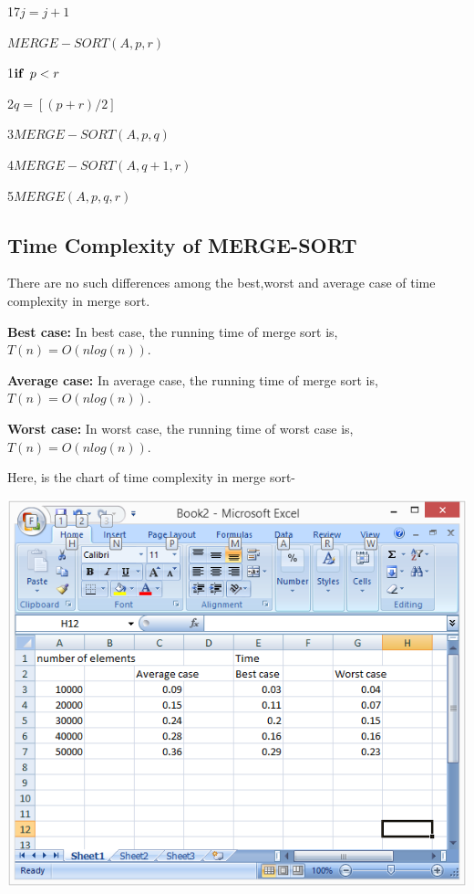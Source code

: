 \documentclass[12 pt,a4paper]{report}
\begin{document}
17\hspace{1.5cm}$j=j+1$

\vspace{1cm}

$MERGE-SORT(A,p,r)$

1\hspace{0.5cm}$\textbf{if}\hspace{0.2cm}p<r$

2\hspace{1cm}$q=\left [(p+r)/2\right]$

3\hspace{1cm}$MERGE-SORT(A,p,q)$

4\hspace{1cm}$MERGE-SORT(A,q+1,r)$

5\hspace{1cm}$MERGE(A,p,q,r)$

\subsection{Time Complexity of MERGE-SORT}

\vspace{1cm}

There are no such differences among the best,worst and average case of time complexity in merge sort.

\textbf{Best case:} In best case, the running time of merge sort is,$T(n)=O(nlog(n))$.
\vspace{0.5cm}

\textbf{Average case:} In average case, the running time of merge sort is, $T(n)=O(nlog(n))$.
\vspace{0.3cm}

\textbf{Worst case:} In worst case, the running time of worst case is, $T(n)=O(nlog(n))$.

Here, is the chart of time complexity in merge sort-

\vspace{1cm}

\includegraphics{mergedata.png}
\end{document}
